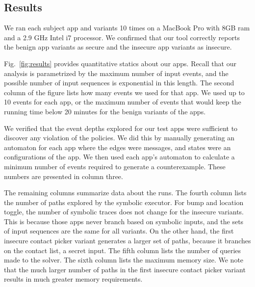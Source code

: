 \documentclass[10pt,conference,compsocconf]{IEEEtran}
\newcommand{\code}[1]{\text{\lstinline!#1!}}
\newcommand{\tfuture}{\mathcal{F}}
\begin{document}




\subsection{Results}

We ran each subject app and variants 10 times on a MacBook Pro with
8GB ram and a 2.9 GHz Intel i7 processor. We
confirmed that our tool correctly reports the benign app variants as
secure and the insecure app variants as insecure.

Fig.~\ref{fig:results} provides quantitative statics about our
apps.  Recall that our analysis is parametrized by the maximum number
of input events, and the possible number of input sequences
is exponential in this length.  The second column of the figure lists
how many events we used for that app. We used up to 10 events
for each app, or the maximum number of events that would keep the
running time below 20 minutes for the benign variants of the apps.

We verified that the event depths explored for our test apps were
sufficient to discover any violation of the policies.  We did this by
manually generating an automaton for each app where the edges were
messages, and states were an configurations of the app.  We then used
each app's automaton to calculate a minimum number of events required
to generate a counterexample.  These numbers are presented in column
three.


The remaining columns summarize data about the runs. The fourth column
lists the number of paths explored by the symbolic
executor. For bump and location toggle, the number of symbolic traces
does not change for the insecure variants. This is because those apps
never branch based on symbolic inputs, and the sets of input sequences
are the same for all variants. On the other hand, the first insecure
contact picker variant generates a larger set of paths, because it
branches on the contact list, a secret input.
The fifth column  lists the number of queries made to the solver. 
The sixth column lists the maximum memory
size. We note that the much larger number of paths in the first insecure
contact picker variant results in much greater memory requirements.
\end{document}
